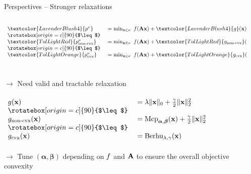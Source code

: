 \begin{frame}{Perspectives -- Stronger relaxations}
    ~\\
    \begin{columns}[T]
        \begin{column}{0.5\textwidth}
            \(
            \begin{array}{lllll}
                \textcolor{LavenderBlush4}{\node{\pobj}} &= \min_{\pv \in \nodeSymb} \ \lfunc(\dic\pv) + \textcolor{LavenderBlush4}{\rfunc}(\pv)
                ~\\
                \rotatebox[origin=c]{90}{$\leq$}
                ~\\
                \textcolor{TolLightRed}{\node{\pobj}_{\text{non-cvx}}} &= \min_{\pv \in \nodeSymb} \ \lfunc(\dic\pv) + \textcolor{TolLightRed}{\rfunc_{\text{non-cvx}}}(\pv)
                ~\\
                \rotatebox[origin=c]{90}{$\leq$}
                ~\\
                \textcolor{TolLightOrange}{\node{\pobj}_{\text{cvx}}} &=  \min_{\pv \in \nodeSymb} \ \lfunc(\dic\pv) + \textcolor{TolLightOrange}{\rfunc_{\text{cvx}}}(\pv)
            \end{array}
        \)
        ~\\
        ~\\
        {\small$\rightarrow$ Need valid and tractable relaxation}
        ~\\
        ~\\
        \(
            \begin{array}{lllll}
                \rfunc(\pv) &= \reg \norm{\pv}{0}+ \tfrac{\gamma}{2}\norm{\pv}{2}^2
                ~\\
                \rotatebox[origin=c]{90}{$\leq$}
                ~\\
                \rfunc_{\text{non-cvx}}(\pv) &=  \text{Mcp}_{\boldsymbol{\alpha},\boldsymbol{\beta}}(\pv) + \tfrac{\gamma}{2}\norm{\pv}{2}^2
                ~\\
                \rotatebox[origin=c]{90}{$\leq$}
                ~\\
                \rfunc_{\text{cvx}}(\pv) &=  \text{Berhu}_{\reg,\gamma}(\pv)
            \end{array}
        \)
        ~\\
        ~\\
        {\small$\rightarrow$ Tune $(\boldsymbol{\alpha},\boldsymbol{\beta})$ depending on $f$ and $\mathbf{A}$ to ensure the overall objective convexity}
      \end{column}
      \hfill
      \begin{column}{0.45\textwidth}
\end{column}
\end{columns}
\end{frame}

